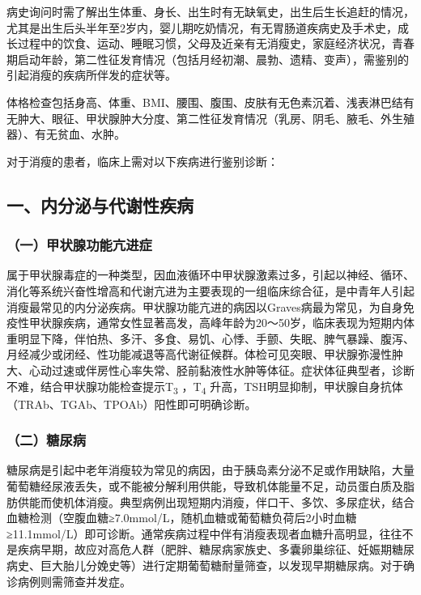 病史询问时需了解出生体重、身长、出生时有无缺氧史，出生后生长追赶的情况，尤其是出生后头半年至2岁内，婴儿期吃奶情况，有无胃肠道疾病史及手术史，成长过程中的饮食、运动、睡眠习惯，父母及近亲有无消瘦史，家庭经济状况，青春期启动年龄，第二性征发育情况（包括月经初潮、晨勃、遗精、变声），需鉴别的引起消瘦的疾病所伴发的症状等。

体格检查包括身高、体重、BMI、腰围、腹围、皮肤有无色素沉着、浅表淋巴结有无肿大、眼征、甲状腺肿大分度、第二性征发育情况（乳房、阴毛、腋毛、外生殖器）、有无贫血、水肿。

对于消瘦的患者，临床上需对以下疾病进行鉴别诊断：

\subsection{一、内分泌与代谢性疾病}

\subsubsection{（一）甲状腺功能亢进症}

属于甲状腺毒症的一种类型，因血液循环中甲状腺激素过多，引起以神经、循环、消化等系统兴奋性增高和代谢亢进为主要表现的一组临床综合征，是中青年人引起消瘦最常见的内分泌疾病。甲状腺功能亢进的病因以Graves病最为常见，为自身免疫性甲状腺疾病，通常女性显著高发，高峰年龄为20～50岁，临床表现为短期内体重明显下降，伴怕热、多汗、多食、易饥、心悸、手颤、失眠、脾气暴躁、腹泻、月经减少或闭经、性功能减退等高代谢征候群。体检可见突眼、甲状腺弥漫性肿大、心动过速或伴房性心率失常、胫前黏液性水肿等体征。症状体征典型者，诊断不难，结合甲状腺功能检查提示T\textsubscript{3}
，T\textsubscript{4}
升高，TSH明显抑制，甲状腺自身抗体（TRAb、TGAb、TPOAb）阳性即可明确诊断。

\subsubsection{（二）糖尿病}

糖尿病是引起中老年消瘦较为常见的病因，由于胰岛素分泌不足或作用缺陷，大量葡萄糖经尿液丢失，或不能被分解利用供能，导致机体能量不足，动员蛋白质及脂肪供能而使机体消瘦。典型病例出现短期内消瘦，伴口干、多饮、多尿症状，结合血糖检测（空腹血糖≥7.0mmol/L，随机血糖或葡萄糖负荷后2小时血糖≥11.1mmol/L）即可诊断。通常疾病过程中伴有消瘦表现者血糖升高明显，往往不是疾病早期，故应对高危人群（肥胖、糖尿病家族史、多囊卵巢综征、妊娠期糖尿病史、巨大胎儿分娩史等）进行定期葡萄糖耐量筛查，以发现早期糖尿病。对于确诊病例则需筛查并发症。

